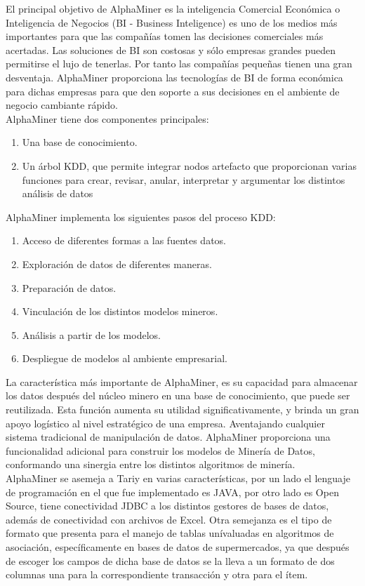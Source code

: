 El principal objetivo de AlphaMiner es la inteligencia Comercial Econ\'omica o Inteligencia de Negocios (BI -
Business Inteligence) es uno de los  medios m\'as importantes para que las compa\~n\'ias tomen las decisiones
comerciales m\'as acertadas. Las soluciones de BI son costosas y s\'olo empresas grandes pueden permitirse el
lujo de tenerlas. Por tanto las compa\~n\'ias peque\~nas tienen una gran desventaja. AlphaMiner proporciona las
tecnolog\'ias de BI de forma econ\'omica para dichas empresas para que den soporte a sus decisiones en el
ambiente de negocio cambiante r\'apido.\\
   
AlphaMiner tiene dos componentes principales:
\begin{enumerate}
\item Una base de conocimiento.
\item Un \'arbol KDD, que permite integrar nodos artefacto que proporcionan varias funciones para crear, revisar,
anular, interpretar y argumentar los distintos an\'alisis de datos
\end{enumerate}

AlphaMiner implementa los siguientes pasos del proceso KDD:
\begin{enumerate}
\item Acceso de diferentes formas a las fuentes datos.
\item Exploraci\'on de datos de diferentes maneras.
\item Preparaci\'on de datos.
\item Vinculaci\'on de los distintos modelos mineros.
\item An\'alisis a partir de los  modelos.
\item Despliegue de modelos al ambiente  empresarial.   
\end{enumerate}

La caracter\'istica m\'as importante de AlphaMiner, es su capacidad para almacenar los datos despu\'es del
n\'ucleo minero en una base de conocimiento, que puede ser reutilizada. Esta funci\'on aumenta su utilidad
significativamente, y  brinda un gran apoyo log\'istico al nivel estrat\'egico de una empresa. Aventajando
cualquier sistema tradicional de manipulaci\'on de datos. AlphaMiner proporciona una funcionalidad adicional para
construir los modelos de Miner\'ia de Datos, conformando una sinergia entre los distintos algoritmos de
miner\'ia.\\

AlphaMiner se asemeja a Tariy en varias caracter\'isticas, por un lado el lenguaje de programaci\'on en el que
fue implementado es JAVA, por otro lado es Open Source, tiene conectividad JDBC a los distintos gestores de bases
de datos, adem\'as de conectividad con archivos de Excel. Otra semejanza es el tipo de formato que presenta para
el manejo de  tablas un\'ivaluadas en algoritmos de asociaci\'on, espec\'ificamente en bases de datos de
supermercados, ya que despu\'es de escoger los campos de dicha base de datos se la lleva a un formato de dos
columnas una para la correspondiente transacci\'on y otra para el \'item.

